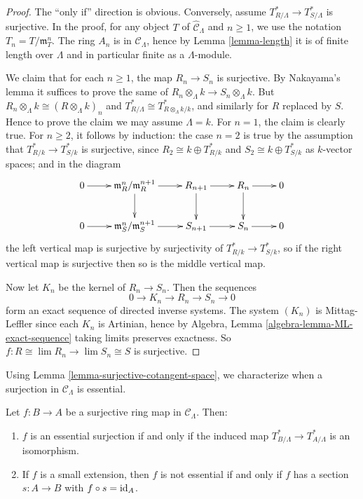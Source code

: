 \begin{proof} 
The ``only if'' direction is obvious.  Conversely, assume $T^*_{R/\Lambda} 
\rightarrow T^*_{S/\Lambda}$ is surjective. In the proof, for any object $T$ of 
$\widehat{\mathcal C}_{\Lambda}$ and $n \geq 1$, we use the notation $T_n = 
T/\mathfrak{m}_{T}^n$. The ring $A_{n}$ is in $\mathcal C_{\Lambda}$, hence by 
Lemma \ref{lemma-length} it is of finite length over $\Lambda$ and in 
particular finite as a $\Lambda$-module.    

\medskip \noindent
We claim that for each $n \geq 1$, the map $R_n \rightarrow S_n$ is surjective. 
 By Nakayama's lemma it suffices to prove the same of $R_n \otimes_{\Lambda} k 
\rightarrow S_n \otimes_{\Lambda} k$.  But $R_n \otimes_{\Lambda} k \cong (R 
\otimes_{\Lambda} k)_n$ and $T^*_{R/\Lambda} \cong T^*_{R \otimes_{\Lambda} 
k/k}$, and similarly for $R$ replaced by $S$. Hence to prove the claim we may 
assume $\Lambda = k$. For $n = 1$, the claim is clearly true.  For $n \geq 2$, 
it follows by induction: the case $n = 2$ is true by the assumption that 
$T^*_{R/k} \rightarrow T^*_{S/k}$ is surjective, since $R_2 \cong k \oplus 
T^*_{R/k}$ and $S_2 \cong k \oplus T^*_{S/k}$ as $k$-vector spaces; and in the 
diagram
\[
\xymatrix{
0 \ar[r] & \mathfrak{m}_{R}^n/\mathfrak{m}_{R}^{n+1} \ar[r] \ar[d] & R_{n+1} 
\ar[r] \ar[d] & R_{n} \ar[r] \ar[d] & 0 \\
0 \ar[r] & \mathfrak{m}_S^{n}/\mathfrak{m}_{S}^{n+1} \ar[r] & S_{n+1} \ar[r] & 
S_{n} \ar[r] & 0
}
\]
the left vertical map is surjective by surjectivity of $T^*_{R/k} \rightarrow 
T^*_{S/k}$, so if the right vertical map is surjective then so is the middle 
vertical map.

\medskip \noindent
Now let $K_n$ be the kernel of $R_n \rightarrow S_n$.  Then the sequences 
\[ 0 \rightarrow K_n \rightarrow R_n \rightarrow S_n \rightarrow 0 \]
form an exact sequence of directed inverse systems.  The system $(K_n)$ is 
Mittag-Leffler since each $K_n$ is Artinian, hence by
Algebra, Lemma \ref{algebra-lemma-ML-exact-sequence}
taking limits preserves exactness.  So $f: R \cong \lim 
R_n \rightarrow \lim S_n \cong S$ is surjective.
\end{proof}

\noindent
Using Lemma \ref{lemma-surjective-cotangent-space}, we characterize when a 
surjection in $\mathcal C_{\Lambda}$ is essential.

\begin{lemma}
\label{lemma-essential-surjection}
Let $f: B \rightarrow A$ be a surjective ring map in $\mathcal C_{\Lambda}$.  
Then:
\begin{enumerate}
\item $f$ is an essential surjection if and only if the induced map 
$T^*_{B/\Lambda} \rightarrow T^*_{A/\Lambda}$ is an isomorphism.
\item If $f$ is a small extension, then $f$ is not essential if and only if $f$ 
has a section $s: A \rightarrow B$ with $f \circ s = \textnormal{id}_A$.
\end{enumerate}
\end{lemma}


